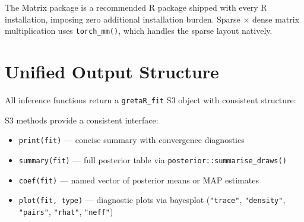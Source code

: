 \documentclass[
  11pt,
]{article}
\newenvironment{Shaded}{\begin{snugshade}}{\end{snugshade}}
\newcommand{\CommentTok}[1]{\textcolor[rgb]{0.56,0.35,0.01}{\textit{#1}}}
\newcommand{\NormalTok}[1]{#1}
\newcommand{\SpecialCharTok}[1]{\textcolor[rgb]{0.81,0.36,0.00}{\textbf{#1}}}
\providecommand{\tightlist}{%
  \setlength{\itemsep}{0pt}\setlength{\parskip}{0pt}}
\begin{document}
The Matrix package is a recommended R package shipped with every R
installation, imposing zero additional installation burden. Sparse
\(\times\) dense matrix multiplication uses \texttt{torch\_mm()}, which
handles the sparse layout natively.

\section{Unified Output Structure}\label{unified-output-structure}

All inference functions return a \texttt{gretaR\_fit} S3 object with
consistent structure:

\begin{Shaded}
\end{Shaded}

S3 methods provide a consistent interface:

\begin{itemize}
\tightlist
\item
  \texttt{print(fit)} --- concise summary with convergence diagnostics
\item
  \texttt{summary(fit)} --- full posterior table via
  \texttt{posterior::summarise\_draws()}
\item
  \texttt{coef(fit)} --- named vector of posterior means or MAP
  estimates
\item
  \texttt{plot(fit,\ type)} --- diagnostic plots via bayesplot
  (\texttt{"trace"}, \texttt{"density"}, \texttt{"pairs"},
  \texttt{"rhat"}, \texttt{"neff"})
\end{itemize}
\end{document}
